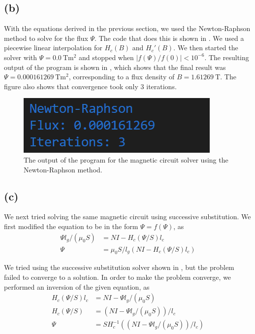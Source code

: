 \documentclass[journal,hidelinks]{IEEEtran}
\begin{document}
\subsection*{(b)}

With the equations derived in the previous section, we used the Newton-Raphson method to solve for the flux $\Psi$. The code that does this is shown in . We used a piecewise linear interpolation for $H_c(B)$ and $H_c'(B)$. We then started the solver with $\Psi = \SI{0.0}{\tesla\meter^2}$ and stopped when $|f(\Psi) / f(0)| < 10^{-6}$. The resulting output of the program is shown in , which shows that the final result was $\Psi = \SI{0.000161269}{\tesla\meter^2}$, corresponding to a flux density of $B = \SI{1.61269}{\tesla}$. The figure also shows that convergence took only $3$ iterations.

\begin{figure}[!htb]
  \centering
  \includegraphics[width=0.8\columnwidth]{question-2/q2b.png}
  \caption{The output of the program for the magnetic circuit solver using the Newton-Raphson method.}
  \label{fig:q2b}
\end{figure}

\subsection*{(c)}

We next tried solving the same magnetic circuit using successive substitution. We first modified the equation to be in the form $\Psi = f(\Psi)$, as
\begin{align}
\Psi l_g / (\mu_0 S) &= N I - H_c(\Psi / S) l_c \\
\Psi &= \mu_0 S / l_g (N I - H_c(\Psi / S) l_c)
\end{align}

We tried using the successive substitution solver shown in , but the problem failed to converge to a solution. In order to make the problem converge, we performed an inversion of the given equation, as
\begin{align}
H_c(\Psi / S) l_c &= N I - \Psi l_g / (\mu_0 S) \\
H_c(\Psi / S) &= (N I - \Psi l_g / (\mu_0 S)) / l_c \\
\Psi &= S H_c^{-1}((N I - \Psi l_g / (\mu_0 S)) / l_c)
\end{align}
\end{document}
